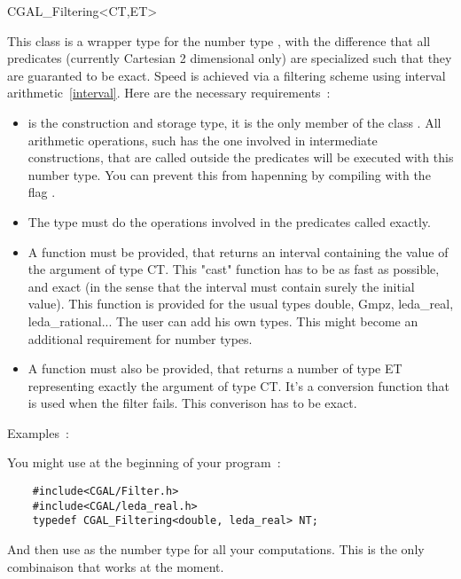 %
%
%

\begin{ccClass} {CGAL_Filtering<CT,ET>}
\label{filter}

This class is a wrapper type for the number type , with the difference
that all predicates (currently Cartesian 2 dimensional only) are specialized
such that they are guaranted to be exact.  Speed is achieved via a filtering
scheme using interval arithmetic~\ref{interval}.  Here are the necessary
requirements~:

\begin{itemize}
\item {} is the construction and storage type, it is the only member of
      the class .  All arithmetic operations, such
      has the one involved in intermediate constructions, that are called
      outside the predicates will be executed with this number type.  You can
      prevent this from hapenning by compiling with the flag
      .
\item The  type must do the operations involved in the predicates
      called exactly.
\item A  function must be provided, that
      returns an interval containing the value of the argument of type CT.
      This "cast" function has to be as fast as possible, and exact (in the
      sense that the interval must contain surely the initial value).  This
      function is provided for the usual types double, Gmpz, leda\_real,
      leda\_rational...  The user can add his own types.  This might become an
      additional requirement for number types.
\item A  function must also be provided, that
      returns a number of type ET representing exactly the argument of type
      CT.  It's a conversion function that is used when the filter fails.
      This converison has to be exact.
\end{itemize}

Examples~:

You might use at the beginning of your program~:

\begin{verbatim}
    #include<CGAL/Filter.h>
    #include<CGAL/leda_real.h>
    typedef CGAL_Filtering<double, leda_real> NT;
\end{verbatim}

And then use  as the number type for all your computations.
This is the only combinaison that works at the moment.


\end{ccClass}
